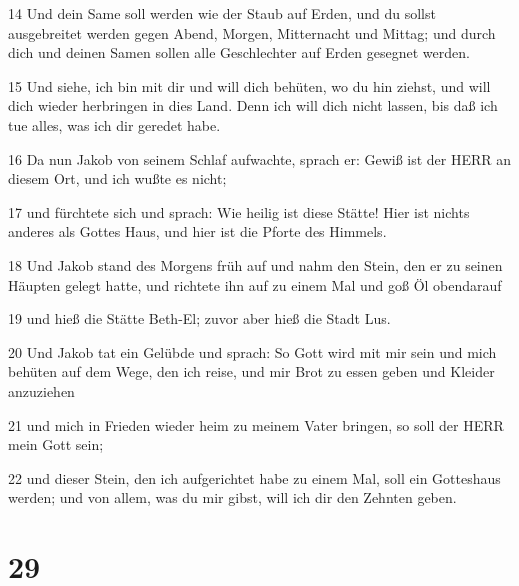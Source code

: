\par 14 Und dein Same soll werden wie der Staub auf Erden, und du sollst ausgebreitet werden gegen Abend, Morgen, Mitternacht und Mittag; und durch dich und deinen Samen sollen alle Geschlechter auf Erden gesegnet werden.
\par 15 Und siehe, ich bin mit dir und will dich behüten, wo du hin ziehst, und will dich wieder herbringen in dies Land. Denn ich will dich nicht lassen, bis daß ich tue alles, was ich dir geredet habe.
\par 16 Da nun Jakob von seinem Schlaf aufwachte, sprach er: Gewiß ist der HERR an diesem Ort, und ich wußte es nicht;
\par 17 und fürchtete sich und sprach: Wie heilig ist diese Stätte! Hier ist nichts anderes als Gottes Haus, und hier ist die Pforte des Himmels.
\par 18 Und Jakob stand des Morgens früh auf und nahm den Stein, den er zu seinen Häupten gelegt hatte, und richtete ihn auf zu einem Mal und goß Öl obendarauf
\par 19 und hieß die Stätte Beth-El; zuvor aber hieß die Stadt Lus.
\par 20 Und Jakob tat ein Gelübde und sprach: So Gott wird mit mir sein und mich behüten auf dem Wege, den ich reise, und mir Brot zu essen geben und Kleider anzuziehen
\par 21 und mich in Frieden wieder heim zu meinem Vater bringen, so soll der HERR mein Gott sein;
\par 22 und dieser Stein, den ich aufgerichtet habe zu einem Mal, soll ein Gotteshaus werden; und von allem, was du mir gibst, will ich dir den Zehnten geben.

\chapter{29}

